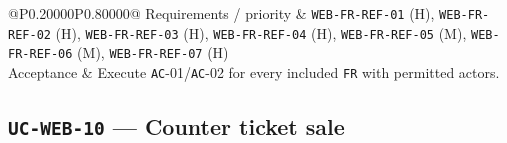 \begin{longtable}{@{}P{0.20000\SRSWidth}P{0.80000\SRSWidth}@{}}
Requirements /\allowbreak{} priority & \texttt{WEB-\allowbreak{}FR-\allowbreak{}REF-\allowbreak{}01} (H), \texttt{WEB-\allowbreak{}FR-\allowbreak{}REF-\allowbreak{}02} (H), \texttt{WEB-\allowbreak{}FR-\allowbreak{}REF-\allowbreak{}03} (H), \texttt{WEB-\allowbreak{}FR-\allowbreak{}REF-\allowbreak{}04} (H), \texttt{WEB-\allowbreak{}FR-\allowbreak{}REF-\allowbreak{}05} (M), \texttt{WEB-\allowbreak{}FR-\allowbreak{}REF-\allowbreak{}06} (M), \texttt{WEB-\allowbreak{}FR-\allowbreak{}REF-\allowbreak{}07} (H) \\[3pt]
Acceptance & Execute \texttt{AC}-01/\allowbreak{}\texttt{AC}-02 for every included \texttt{FR} with permitted actors. \\[3pt]
\end{longtable}
\endgroup

\subsection{\texttt{UC-\allowbreak{}WEB-\allowbreak{}10} — Counter ticket sale}
\begingroup
\fontsize{9.5}{12}\selectfont
\setlength{\SRSWidth}{\dimexpr\linewidth-2\tabcolsep\relax}

